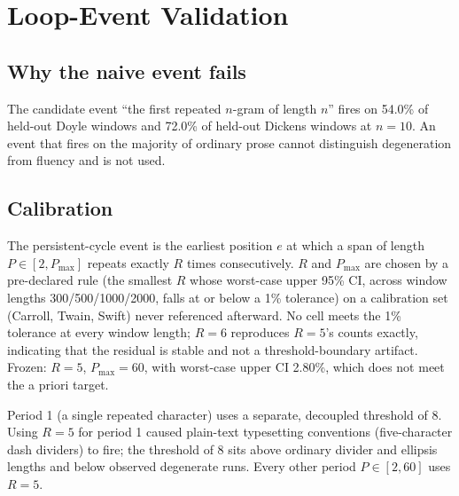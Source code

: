 \documentclass[make,article,submit,pdftex]{Definitions/mdpi}
\begin{document}
\section{Loop-Event Validation}
\label{sec:event}

\subsection{Why the naive event fails}
\label{ssec:naive-fails}
The candidate event ``the first repeated $n$-gram of length $n$'' fires on 54.0\% of held-out Doyle windows and 72.0\% of held-out Dickens windows at $n{=}10$. An event that fires on the majority of ordinary prose cannot distinguish degeneration from fluency and is not used.

\subsection{Calibration}
The persistent-cycle event is the earliest position $e$ at which a span of length $P\in[2,P_{\max}]$ repeats exactly $R$ times consecutively. $R$ and $P_{\max}$ are chosen by a pre-declared rule (the smallest $R$ whose worst-case upper 95\% CI, across window lengths 300/500/1000/2000, falls at or below a 1\% tolerance) on a calibration set (Carroll, Twain, Swift) never referenced afterward. No cell meets the 1\% tolerance at every window length; $R{=}6$ reproduces $R{=}5$'s counts exactly, indicating that the residual is stable and not a threshold-boundary artifact. Frozen: $R{=}5$, $P_{\max}{=}60$, with worst-case upper CI 2.80\%, which does not meet the a priori target.

Period 1 (a single repeated character) uses a separate, decoupled threshold of 8. Using $R{=}5$ for period 1 caused plain-text typesetting conventions (five-character dash dividers) to fire; the threshold of 8 sits above ordinary divider and ellipsis lengths and below observed degenerate runs. Every other period $P\in[2,60]$ uses $R{=}5$.
\end{document}
